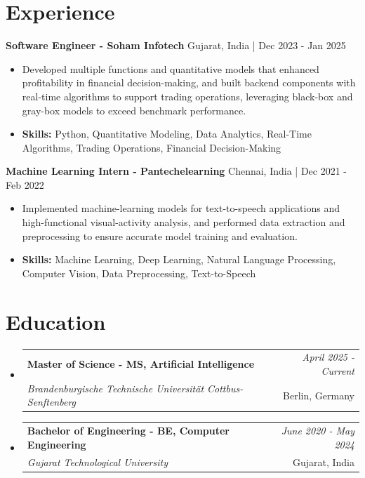 \documentclass[a4paper,11pt]{article}
\makeatletter
\newcommand{\resumeSubheading}[4]{
\vspace{0.5mm}\item
    \begin{tabular*}{\linewidth}[t]{l@{\extracolsep{\fill}}r}
        \textbf{#1} & \textit{\footnotesize{#4}} \\
        \textit{\footnotesize{#3}} &  \footnotesize{#2}\\
    \end{tabular*}
    \vspace{-2.4mm}
}
\makeatother
\begin{document}
\section{\textbf{Experience}}


\vspace{1mm}
  \textbf{Software Engineer - Soham Infotech} \hfill Gujarat, India | Dec 2023 - Jan 2025
\vspace{-1.5mm} %
\begin{itemize}
  \item Developed multiple functions and quantitative models that enhanced profitability in financial decision-making, and built backend components with real-time algorithms to support trading operations, leveraging black-box and gray-box models to exceed benchmark performance.

\vspace{-2mm}
  \item \textbf{Skills:} Python, Quantitative Modeling, Data Analytics, Real-Time Algorithms, Trading Operations, Financial Decision-Making
\end{itemize}

\vspace{1mm}
  \textbf{Machine Learning Intern - Pantechelearning} \hfill Chennai, India | Dec 2021 - Feb 2022
\vspace{-1.5mm} %
\begin{itemize}
  \item Implemented machine-learning models for text-to-speech applications and high-functional visual-activity analysis, and performed data extraction and preprocessing to ensure accurate model training and evaluation.
\vspace{-2mm}
  \item \textbf{Skills:} Machine Learning, Deep Learning, Natural Language Processing, Computer Vision, Data Preprocessing, Text-to-Speech
\end{itemize}\section{\textbf{Education}}
\vspace{-0.4mm}

\begin{itemize}[leftmargin=0.15in, label={}]
\resumeSubheading
{Master of Science - MS, Artificial Intelligence }{Berlin, Germany}
{Brandenburgische Technische Universität Cottbus-Senftenberg  }{April 2025 - Current}

\vspace{1.0mm} %
\resumeSubheading
{Bachelor of Engineering - BE, Computer Engineering  }{Gujarat, India}
{Gujarat Technological University }{June 2020 - May 2024}

\end{itemize}
\end{document}
